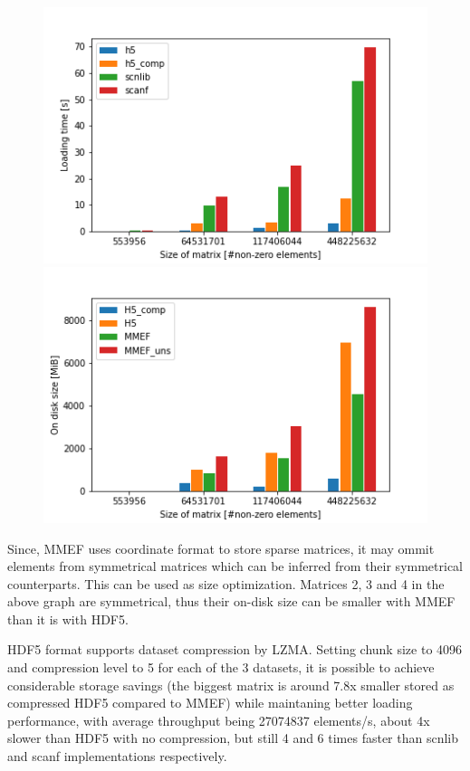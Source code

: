 \documentclass[thesis=M,english]{FITthesis}[2019/12/23]
\begin{document}
\begin{figure}[!h]
    \centering
    \begin{minipage}{.5\textwidth}
        \centering
        \includegraphics[scale=0.45]{static/matrix_loading.png}
    \end{minipage}%
    \begin{minipage}{.5\textwidth}
        \centering
        \includegraphics[scale=0.45]{static/storage_sizes.png}
    \end{minipage}
\end{figure}


Since, MMEF uses coordinate format to store sparse matrices, it may ommit elements from symmetrical matrices which can be inferred
from their symmetrical counterparts. This can be used as size optimization. Matrices 2, 3 and 4 in the above graph are symmetrical,
thus their on-disk size can be smaller with MMEF than it is with HDF5.

HDF5 format supports dataset compression by LZMA. Setting chunk size to 4096 and compression level to 5 for each of the 3 datasets,
it is possible to achieve considerable storage savings (the biggest matrix is around 7.8x smaller stored as compressed HDF5 compared to MMEF)
while maintaning better loading performance, with average throughput being 27074837 elements/s, about 4x slower than HDF5 with no compression,
but still 4 and 6 times faster than scnlib and scanf implementations respectively.
\end{document}
